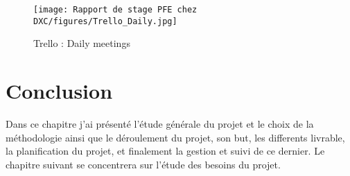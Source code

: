 \begin{figure}[H]
    \centering
    \texttt{[image: Rapport de stage PFE chez DXC/figures/Trello\_Daily.jpg]}
    \caption{Trello : Daily meetings}
\end{figure}

\section{Conclusion}

Dans ce chapitre j’ai présenté l’étude générale du projet et le choix de la méthodologie ainsi
que le déroulement du projet, son but, les differents livrable, la planification du projet, et finalement la gestion et suivi de ce dernier. Le chapitre suivant se concentrera sur l’étude des besoins du projet.

